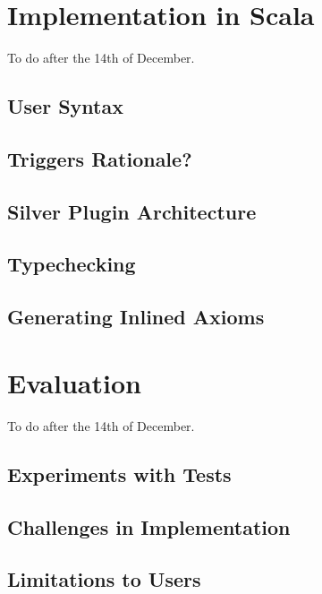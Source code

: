 \documentclass[msc,oneside]{ubcthesis}
\theoremstyle{definition}
\begin{document}


\chapter{Implementation in Scala}
To do after the 14th of December. 
\section{User Syntax}

\section{Triggers Rationale?}

\section{Silver Plugin Architecture}

\section{Typechecking}

\section{Generating Inlined Axioms}

\chapter{Evaluation}
To do after the 14th of December. 

\section{Experiments with Tests}

\section{Challenges in Implementation}

\section{Limitations to Users}
\end{document}
